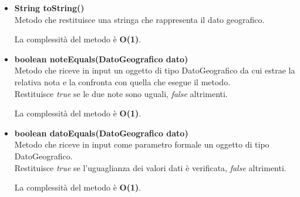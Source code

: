 \documentclass[a4paper, 12pt]{scrreprt}
\begin{document}
\begin{itemize}
				La complessit\`a del metodo è \textbf{O(1)}.
				
				\item \textbf{String toString()}
				\\Metodo che restituisce una stringa che rappresenta il dato geografico.
				
				La complessit\`a del metodo è \textbf{O(1)}.
				
				\item \textbf{boolean noteEquals(DatoGeografico dato)}
				\\Metodo che riceve in input un oggetto di tipo DatoGeografico da cui estrae la relativa nota e la confronta con quella che esegue il metodo.
				\\Restituisce \textit{true} se le due note sono uguali, \textit{false} altrimenti.
				
				La complessit\`a del metodo è \textbf{O(1)}.
				
				\item \textbf{boolean datoEquals(DatoGeografico dato)}
				\\Metodo che riceve in input come parametro formale un oggetto di tipo DatoGeografico.
				\\Restituisce \textit{true} se l'uguaglianza dei valori dati \`e verificata, \textit{false} altrimenti.
				
				La complessit\`a del metodo è \textbf{O(1)}.
				
			\end{itemize}
\end{document}
